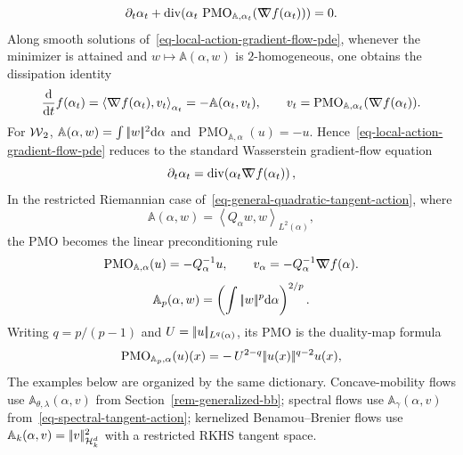 \begin{equation}\label{eq-local-action-gradient-flow-pde}
\partial_t\alpha_t
+
\operatorname{div}\!\left(
\alpha_t\,\operatorname{PMO}_{\mathbb A,\alpha_t}(\mathord{\nabla\mkern-9.3mu\nabla} f(\alpha_t))
\right)=0.
\end{equation}
Along smooth solutions of~\eqref{eq-local-action-gradient-flow-pde}, whenever the minimizer is attained and \(w\mapsto\mathbb A(\alpha,w)\) is \(2\)-homogeneous, one obtains the dissipation identity
\[
\frac{\mathrm{d}}{\mathrm{d} t}f(\alpha_t)
=
\left\langle \mathord{\nabla\mkern-9.3mu\nabla} f(\alpha_t),v_t\right\rangle_{\alpha_t}
=
-\mathbb A(\alpha_t,v_t),
\qquad
v_t=\operatorname{PMO}_{\mathbb A,\alpha_t}(\mathord{\nabla\mkern-9.3mu\nabla} f(\alpha_t)).
\]
For \(\operatorname{\mathcal{W}}_2\), \(\mathbb A(\alpha,w)=\int|\!| w |\!|^2\mathrm{d}\alpha\) and \(\operatorname{PMO}_{\mathbb A,\alpha}(u)=-u\). Hence~\eqref{eq-local-action-gradient-flow-pde} reduces to the standard Wasserstein gradient-flow equation
\[
\partial_t\alpha_t
=
\operatorname{div}\!\left(\alpha_t\mathord{\nabla\mkern-9.3mu\nabla} f(\alpha_t)\right),
\]
In the restricted Riemannian case of~\eqref{eq-general-quadratic-tangent-action}, where
\[
\mathbb A(\alpha,w)=\left\langle Q_\alpha w,w\right\rangle_{L^2(\alpha)},
\]
the PMO becomes the linear preconditioning rule
\begin{equation}\label{eq-generalized-gradient-q-preconditioner}
\operatorname{PMO}_{\mathbb A,\alpha}(u)
=
-Q_\alpha^{-1}u,
\qquad
v_\alpha=-Q_\alpha^{-1}\mathord{\nabla\mkern-9.3mu\nabla} f(\alpha).
\end{equation}
\[
\mathbb A_p(\alpha,w)=\left(\int|\!| w |\!|^p\mathrm{d}\alpha\right)^{2/p}.
\]
Writing \(q=p/(p-1)\) and \(U=|\!| u |\!|_{L^q(\alpha)}\), its PMO is the duality-map formula
\begin{equation}\label{eq-wp-pmo}
\operatorname{PMO}_{\mathbb A_p,\alpha}(u)(x)
=
-\,U^{2-q}|\!| u(x) |\!|^{q-2}u(x),
\end{equation}
The examples below are organized by the same dictionary. Concave-mobility flows use $\mathbb A_{\theta,\lambda}(\alpha,v)$ from Section~\ref{rem-generalized-bb}; spectral flows use $\mathbb A_\gamma(\alpha,v)$ from~\eqref{eq-spectral-tangent-action}; kernelized Benamou--Brenier flows use $\mathbb A_k(\alpha,v)=|\!| v |\!|_{\mathcal{H}_k^d}^2$ with a restricted RKHS tangent space.

